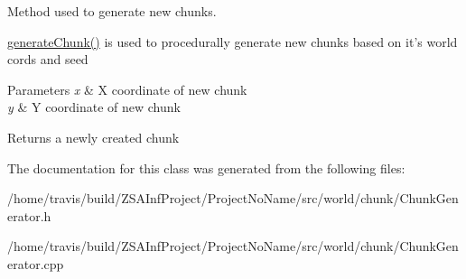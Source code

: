 Method used to generate new chunks. 

\hyperlink{classChunkGenerator_acb1e4d2b1d2d620a92fd3e311ddd42cf}{generate\-Chunk()} is used to procedurally generate new chunks based on it's world cords and seed 
\begin{DoxyParams}{Parameters}
{\em x} & X coordinate of new chunk \\
\hline
{\em y} & Y coordinate of new chunk \\
\hline
\end{DoxyParams}
\begin{DoxyReturn}{Returns}
a newly created chunk 
\end{DoxyReturn}


The documentation for this class was generated from the following files\-:\begin{DoxyCompactItemize}
\item 
/home/travis/build/\-Z\-S\-A\-Inf\-Project/\-Project\-No\-Name/src/world/chunk/Chunk\-Generator.\-h\item 
/home/travis/build/\-Z\-S\-A\-Inf\-Project/\-Project\-No\-Name/src/world/chunk/Chunk\-Generator.\-cpp\end{DoxyCompactItemize}
